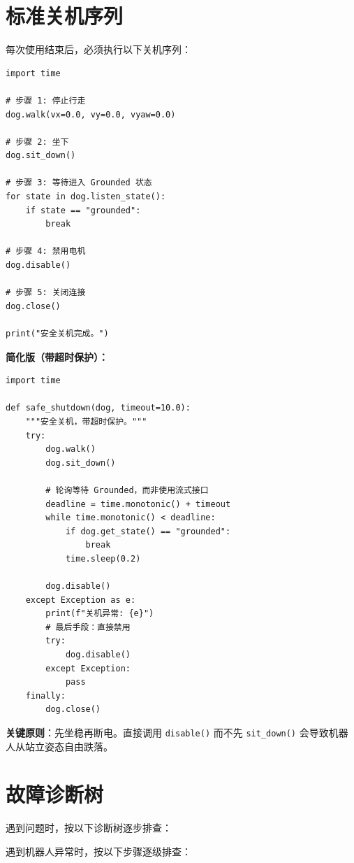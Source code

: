 \documentclass[a4paper,11pt,openany]{book}
\begin{document}
\section{标准关机序列}

每次使用结束后，必须执行以下关机序列：

\begin{lstlisting}[style=python]
import time

# 步骤 1: 停止行走
dog.walk(vx=0.0, vy=0.0, vyaw=0.0)

# 步骤 2: 坐下
dog.sit_down()

# 步骤 3: 等待进入 Grounded 状态
for state in dog.listen_state():
    if state == "grounded":
        break

# 步骤 4: 禁用电机
dog.disable()

# 步骤 5: 关闭连接
dog.close()

print("安全关机完成。")
\end{lstlisting}

\noindent\textbf{简化版（带超时保护）：}

\begin{lstlisting}[style=python]
import time

def safe_shutdown(dog, timeout=10.0):
    """安全关机，带超时保护。"""
    try:
        dog.walk()
        dog.sit_down()

        # 轮询等待 Grounded，而非使用流式接口
        deadline = time.monotonic() + timeout
        while time.monotonic() < deadline:
            if dog.get_state() == "grounded":
                break
            time.sleep(0.2)

        dog.disable()
    except Exception as e:
        print(f"关机异常: {e}")
        # 最后手段：直接禁用
        try:
            dog.disable()
        except Exception:
            pass
    finally:
        dog.close()
\end{lstlisting}

\noindent\textbf{关键原则}：先坐稳再断电。直接调用 \texttt{disable()} 而不先 \texttt{sit\_down()} 会导致机器人从站立姿态自由跌落。

\section{故障诊断树}

遇到问题时，按以下诊断树逐步排查：

遇到机器人异常时，按以下步骤逐级排查：
\end{document}
